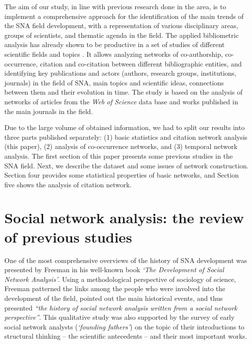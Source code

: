\documentclass[11pt]{article} %
\begin{document}
The aim of our study, in line with previous research done in the area, is to implement a comprehensive approach for the identification of the main  trends of the SNA field development, with a representation of various disciplinary areas, groups of scientists, and thematic agenda in the field. The applied bibliometric analysis has already shown to be productive in a set of studies of different scientific fields and topics \citep{kejzar,Understand,PeerRew}. It allows analyzing networks of co-authorship, co-occurrence, citation and co-citation between different bibliographic entities, and identifying key publications and actors (authors, research groups, institutions, journals) in the field of SNA, main topics and scientific ideas, connections between them and their evolution in time. The study is based on the analysis of networks of articles from the \textit{Web of Science} data base and works published in the main journals in the field. \medskip 

Due to the large volume of obtained information, we had to split our results into three parts published separately: (1) basic statistics and citation network analysis (this paper), (2) analysis of co-occurrence networks, and (3) temporal network analysis. The first section of this paper presents some previous studies in the SNA field. Next, we describe the dataset and some issues of network construction. Section four provides some statistical properties of basic networks, and Section five shows the analysis of citation network.

\section{Social network analysis: the review of previous studies}

One of the most comprehensive overviews of the history of SNA development was presented by Freeman in his well-known book \textit{`The Development of Social Network Analysis'}\citep{SNAdev}. Using a methodological perspective of sociology of science, Freeman patterned the links among the people who were involved into the development of the field,  pointed out the main historical events, and thus presented \textit{“the history of social network analysis written from a social network perspective”}. This qualitative study was also supported by the survey of early social network analysts (\textit{`founding fathers'}) on the topic of their introductions to structural thinking -- the scientific antecedents -- and their most important works. \medskip 
\end{document}
